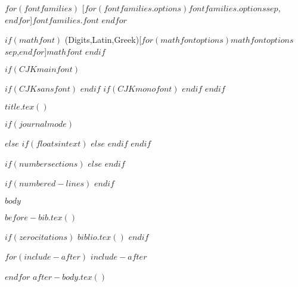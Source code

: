 $for(fontfamilies)$
  [$for(fontfamilies.options)$$fontfamilies.options$$sep$,$endfor$]{$fontfamilies.font$}
$endfor$

$if(mathfont)$
\setmathfont(Digits,Latin,Greek)[$for(mathfontoptions)$$mathfontoptions$$sep$,$endfor$]{$mathfont$}
$endif$

$if(CJKmainfont)$
    \usepackage{xeCJK}
    $if(CJKsansfont)$
    $endif$
    $if(CJKmonofont)$
    $endif$
$endif$

$title.tex()$

$if(journalmode)$
\usepackage{float}
\makeatletter
\let\oldtpt\ThreePartTable
\let\endoldtpt\endThreePartTable
\def\ThreePartTable{\@ifnextchar[\ThreePartTable@i \ThreePartTable@ii}
\def\ThreePartTable@i[#1]{\begin{figure}
\onecolumn
\begin{minipage}{0.5\textwidth}
\oldtpt[#1]
}
\def\ThreePartTable@ii{\begin{figure}
\onecolumn
\begin{minipage}{0.5\textwidth}
\oldtpt
}
\def\endThreePartTable{
\endoldtpt
\end{minipage}
\twocolumn
\end{figure}}
\makeatother


\makeatletter
\let\endoldlt\endlongtable		
\def\endlongtable{
\hline
\endoldlt}
\makeatother

\newenvironment{twocolumntable}%
{%
\begin{table*}%
\onecolumn%
}%
{%
\twocolumn%
\end{table*}%
}%
$else$
\makeatletter
\let\endoldlt\endlongtable
\def\endlongtable{
\hline
\endoldlt
}
\makeatother
$if(floatsintext)$
$else$
\RequirePackage{longtable}
$endif$
$endif$







\maketitle
$if(numbersections)$
\setcounter{secnumdepth}{$if(secnumdepth)$$secnumdepth$$else$5$endif$}
$else$
\setcounter{secnumdepth}{-\maxdimen} %
$endif$

\setlength\LTleft{0pt}

$if(numbered-lines)$
\resetlinenumber[1]
$endif$

$body$

$before-bib.tex()$

$if(zerocitations)$
$biblio.tex()$
$endif$

$for(include-after)$
$include-after$

$endfor$
$after-body.tex()$


